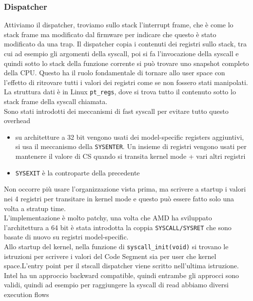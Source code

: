 \documentclass[12pt, oneside]{extbook} %
\begin{document}
\subsubsection{Dispatcher}
Attiviamo il dispatcher, troviamo sullo stack l'interrupt frame, che è come lo stack frame ma modificato dal firmware per indicare che questo è stato modificato da una trap. Il dispatcher copia i contenuti dei registri sullo stack, tra cui ad esempio gli argomenti della syscall, poi si fa l'invocazione della syscall e quindi sotto lo stack della funzione corrente si può trovare uno snapshot completo della CPU. Questo ha il ruolo fondamentale di tornare allo user space con l'effetto di ritrovare tutti i valori dei registri come se non fossero stati manipolati.\\La struttura dati è in Linux \texttt{pt\_regs}, dove si trova tutto il contenuto sotto lo stack frame della syscall chiamata.\\Sono stati introdotti dei meccanismi di fast syscall per evitare tutto questo overhead
\begin{itemize}
\item su architetture a 32 bit vengono usati dei model-specific registers aggiuntivi, si usa il meccanismo della \texttt{SYSENTER}. Un insieme di 
registri vengono usati per mantenere il valore di CS quando si transita kernel mode + vari altri registri
\item \texttt{SYSEXIT} è la controparte della precedente
\end{itemize}
Non occorre più usare l'organizzazione vista prima, ma scrivere a startup i valori nei 4 registri per transitare in kernel mode e questo può essere fatto solo una volta a stratup time.\\L'implementazione è molto patchy, una volta che AMD ha sviluppato l'architettura a 64 bit è stata introdotta la coppia \texttt{SYSCALL/SYSRET} che sono basate di nuovo su registri model-specific.\\Allo startup del kernel, nella funzione di \texttt{syscall\_init(void)} si trovano le istruzioni per scrivere i valori del Code Segment sia per user che kernel space.L'entry point per il stscall dispatcher viene scritto nell'ultima istruzione.
Intel ha un approccio backward compatible, quindi entrambe gli approcci sono validi, quindi ad esempio per raggiungere la syscall di read abbiamo diversi execution flows
\end{document}
